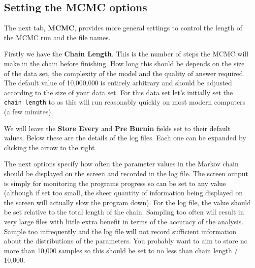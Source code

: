 \documentclass[11pt]{article}
\newcommand{\TODO}[1]{}
\theoremstyle{plain}%
\theoremstyle{definition}
\theoremstyle{remark}
\begin{document}


\subsection{Setting the MCMC options}


The next tab, {\bf MCMC}, provides more general
settings to control the length of the MCMC run and the file names. 

Firstly we have the \textbf{Chain Length}. This is the number of
steps the MCMC will make in the chain before finishing. How long this
should be depends on the size of the data set, the complexity of the
model and the quality of answer required. The default value of 10,000,000
is entirely arbitrary and should be adjusted according to the size
of your data set. For this data set let's initially set the \texttt{chain
length} to \underline{\chainLength{}} as this will run reasonably quickly on most modern
computers (a few minutes).


We will leave the \textbf{Store Every}  and \textbf{Pre Burnin} fields set to their default values. Below these are the details of the log files. Each one can be expanded by clicking the arrow to the right

The next options specify how often the parameter values in the Markov
chain should be displayed on the screen and recorded in the log file.
The screen output is simply for monitoring the programs progress so
can be set to any value (although if set too small, the sheer quantity
of information being displayed on the screen will actually slow the
program down). For the log file, the value should be set relative
to the total length of the chain. Sampling too often will result in
very large files with little extra benefit in terms of the accuracy
of the analysis. Sample too infrequently and the log file will not
record sufficient information about the distributions of the parameters. 
You probably want to aim to store no more than 10,000 samples so this should be
set to no less than chain length / 10,000.
\end{document}
